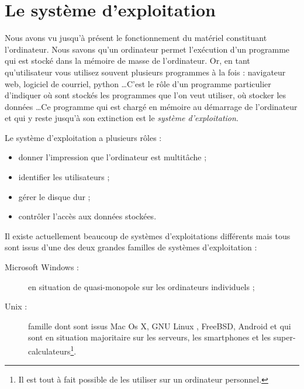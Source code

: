 \section{Le système d'exploitation}
Nous avons vu jusqu'à présent le fonctionnement du matériel constituant l'ordinateur. Nous savons qu'un ordinateur permet l'exécution d'un programme qui est stocké dans la mémoire de masse de l'ordinateur. Or, en tant qu'utilisateur vous utilisez souvent plusieurs programmes à la fois : navigateur web, logiciel de courriel, python \dots C'est le rôle d'un programme particulier d'indiquer où sont stockés les programmes que l'on veut utiliser, où stocker les données \dots Ce programme qui est chargé en mémoire au démarrage de l'ordinateur et qui y reste jusqu'à son extinction est le \emph{système d'exploitation}.\par
Le système d'exploitation a plusieurs rôles :
\begin{itemize}
\item donner l'impression que l'ordinateur est multitâche ;
\item identifier les utilisateurs ;
\item gérer le disque dur ;
\item contrôler l'accès aux données stockées.
\end{itemize}
Il existe actuellement beaucoup de systèmes d'exploitations différents mais tous sont issus d'une des deux grandes familles de systèmes d'exploitation :
\begin{description}
\item[Microsoft Windows :] en situation de quasi-monopole sur les ordinateurs individuels ;
\item[Unix :] famille dont sont issus Mac Os X, GNU Linux , FreeBSD, Android et qui sont en situation majoritaire sur les serveurs, les smartphones et les super-calculateurs\footnote{Il est tout à fait possible de les utiliser sur un ordinateur personnel.}.
\end{description}
